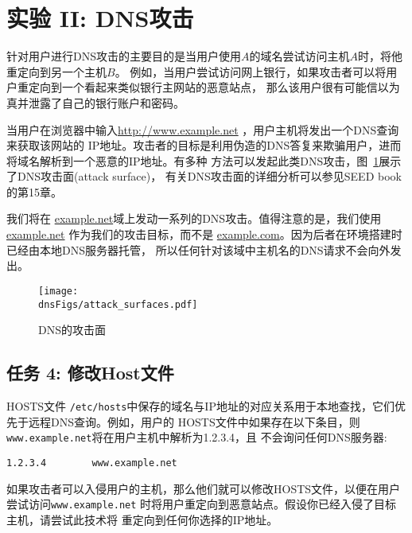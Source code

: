 \section{实验 II: DNS攻击}


针对用户进行DNS攻击的主要目的是当用户使用$A$的域名尝试访问主机$A$时，将他重定向到另一个主机$B$。
例如，当用户尝试访问网上银行，如果攻击者可以将用户重定向到一个看起来类似银行主网站的恶意站点，
那么该用户很有可能信以为真并泄露了自己的银行账户和密码。

当用户在浏览器中输入\url{http://www.example.net} ，用户主机将发出一个DNS查询来获取该网站的
IP地址。攻击者的目标是利用伪造的DNS答复来欺骗用户，进而将域名解析到一个恶意的IP地址。有多种
方法可以发起此类DNS攻击，图~\ref{dns:fig:attack_surface}展示了DNS攻击面(attack surface)，
有关DNS攻击面的详细分析可以参见SEED book的第15章。

我们将在 \url{example.net}域上发动一系列的DNS攻击。值得注意的是，我们使用 \url{example.net}
作为我们的攻击目标，而不是 \url{example.com}。因为后者在环境搭建时已经由本地DNS服务器托管，
所以任何针对该域中主机名的DNS请求不会向外发出。



\begin{figure}[tb]
\centering
\texttt{[image: \\dnsFigs/attack\_surfaces.pdf]}
\caption{DNS的攻击面}
\label{dns:fig:attack_surface}
\end{figure}



\subsection{任务 4: 修改Host文件}

HOSTS文件 \texttt{/etc/hosts}中保存的域名与IP地址的对应关系用于本地查找，它们优先于远程DNS查询。例如，用户的
HOSTS文件中如果存在以下条目，则\texttt{www.example.net}将在用户主机中解析为1.2.3.4，且
不会询问任何DNS服务器:

\begin{verbatim}
1.2.3.4        www.example.net
\end{verbatim}

如果攻击者可以入侵用户的主机，那么他们就可以修改HOSTS文件，以便在用户尝试访问{\tt www.example.net}
时将用户重定向到恶意站点。假设你已经入侵了目标主机，请尝试此技术将 \wwwbank 重定向到任何你选择的IP地址。

